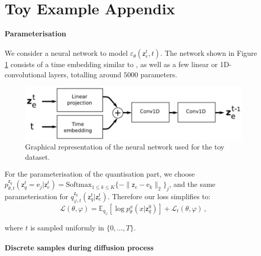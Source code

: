 \documentclass{article}
\theoremstyle{plain}
\theoremstyle{definition}
\theoremstyle{remark}
\newcommand{\latentcont}{\mathsf{z}_e}
\newcommand{\latentdis}{\mathsf{z}_q}
\newcommand{\rme}{\mathrm{e}}
\newcommand{\embed}{\rme}
\begin{document}
\section{Toy Example Appendix}
\label{ap:additionaltoy}

\paragraph{Parameterisation}

We consider a neural network to model  $\varepsilon_\theta(\latentcont^t ,t)$. The network shown in Figure  \ref{ap:fig:toynetwork} consists of a time embedding similar to \cite{ho2020denoising}, as well as a few linear or 1D-convolutional layers, totalling around $5000$ parameters.

\begin{figure}[h!]
    \centering
    \includegraphics[scale=.9]{./network_toy.pdf}
    \caption{Graphical representation of the neural network used for the toy dataset.}
    \label{ap:fig:toynetwork}
\end{figure}

For the parameterisation of the quantisation part, we choose $p_{\theta,t}^{\latentdis}(\latentdis^{t}=\embed_j|\latentcont^{t}) = \mathrm{Softmax}_{1\leq k \leq K}\{-\|\latentcont - \embed_k\|_2\}_j$, and the same parameterisation for $q_{\varphi,t}^{\latentdis}(\latentdis^{t}|\latentcont^{t})$. Therefore our loss simplifies to:
$$
\mathcal{L}(\theta,\varphi) = \mathbb{E}_{q_{\varphi}}\left[\log p^x_{\theta}(x|\latentdis^{0})\right] +  \mathcal{L}_t(\theta,\varphi)\,,
$$

where $t$ is sampled uniformly in $\{0,\ldots,T\}$.

\paragraph{Discrete samples during diffusion process}
\end{document}
